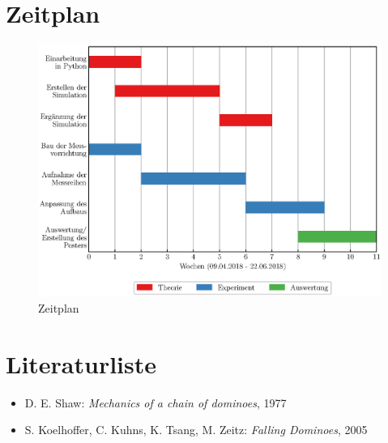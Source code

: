 \documentclass[11pt,a4paper]{scrartcl}
\begin{document}
\section{Zeitplan}
\begin{figure}[h!]
    \centering
    \includegraphics[width=\textwidth]{timetable.eps}
    \caption{Zeitplan}
    \label{abb:2}
\end{figure}


\section{Literaturliste}
\begin{itemize}
    \item D. E. Shaw: \emph{Mechanics of a chain of dominoes}, 1977
    \item S. Koelhoffer, C. Kuhns, K. Tsang, M. Zeitz: \emph{Falling Dominoes}, 2005 \\
\end{itemize}
\end{document}
